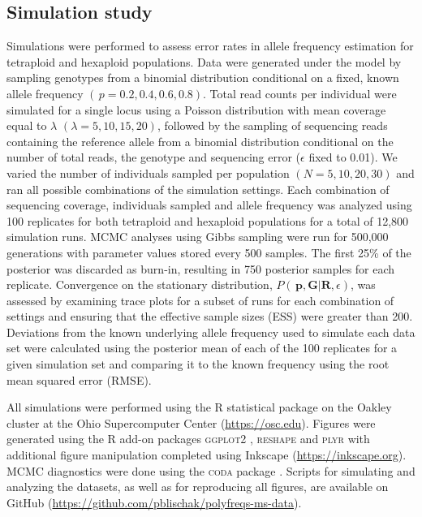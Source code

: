 \documentclass[11pt,english,letterpaper,oneside]{article}
\begin{document}
\medskip
\subsection*{Simulation study}
\medskip

Simulations were performed to assess error rates in allele frequency estimation for tetraploid and hexaploid populations. Data were generated under the model by sampling genotypes from a binomial distribution conditional on a fixed, known allele frequency $(\,p = 0.2, 0.4, 0.6, 0.8)$. Total read counts per individual were simulated for a single locus using a Poisson distribution with mean coverage equal to $\lambda$ $(\lambda = 5, 10, 15, 20)$, followed by the sampling of sequencing reads containing the reference allele from a binomial distribution conditional on the number of total reads, the genotype and sequencing error ($\epsilon$ fixed to 0.01). We varied the number of individuals sampled per population $(N = 5, 10, 20, 30)$ and ran all possible combinations of the simulation settings. Each combination of sequencing coverage, individuals sampled and allele frequency was analyzed using 100 replicates for both tetraploid and hexaploid populations for a total of 12,800 simulation runs. MCMC analyses using Gibbs sampling were run for 500,000 generations with parameter values stored every 500 samples. The first 25\% of the posterior was discarded as burn-in, resulting in 750 posterior samples for each replicate. Convergence on the stationary distribution, $P(\,\bm{p},\bm{G}|\bm{R},\epsilon)$, was assessed by examining trace plots for a subset of runs for each combination of settings and ensuring that the effective sample sizes (ESS) were greater than 200. Deviations from the known underlying allele frequency used to simulate each data set were calculated using the posterior mean of each of the 100 replicates for a given simulation set and comparing it to the known frequency using the root mean squared error (RMSE).
\medskip

All simulations were performed using the R statistical package \citep{r2014} on the Oakley cluster at the Ohio Supercomputer Center (\url{https://osc.edu}). Figures were generated using the R add-on packages \textsc{ggplot2} \citep{wickham2009ggplot2}, \textsc{reshape} \citep{wickham2011plyr} and \textsc{plyr} \citep{wickham2007reshape} with additional figure manipulation completed using Inkscape (\url{https://inkscape.org}). MCMC diagnostics were done using the \textsc{coda} package \citep{plummer2006coda}. Scripts for simulating and analyzing the datasets, as well as for reproducing all figures, are available on GitHub (\url{https://github.com/pblischak/polyfreqs-ms-data}).
\medskip
\end{document}
